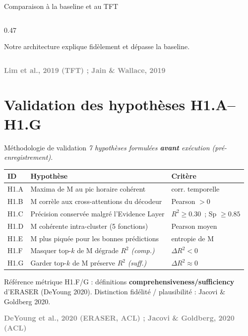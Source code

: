 \documentclass[10pt]{beamer}
\newcommand{\source}[1]{\vspace{4pt}\hfill{\textcolor{gray}{\textbf{\tiny #1}}}}
\begin{document}
\begin{frame}{Comparaison à la baseline et au TFT}
\begin{columns}
\begin{column}{0.47\textwidth}
      \begin{verdictbox}
        \centering\footnotesize
        Notre architecture explique \alert{fidèlement} et \alert{dépasse} la baseline.
      \end{verdictbox}
    \end{column}
  \end{columns}

  \source{Lim et al., 2019 (TFT) ; Jain \& Wallace, 2019}
\end{frame}


\section{Validation des hypothèses H1.A--H1.G}

\begin{frame}{Méthodologie de validation}
  \vspace{-3pt}
  {\footnotesize\textcolor{gray!70}{\textit{7 hypothèses formulées \textbf{avant} exécution (pré-enregistrement).}}}
  \vspace{2pt}

  \begin{minipage}{\linewidth}
  {\footnotesize\setlength{\tabcolsep}{5pt}
  \begin{tabular}{@{}l l l@{}}
    \toprule
    \textbf{ID} & \textbf{Hypothèse} & \textbf{Critère} \\
    \midrule
    H1.A & Maxima de M au pic horaire cohérent & corr. temporelle \\[2pt]
    H1.B & M corrèle aux cross-attentions du décodeur & Pearson $> 0$ \\[2pt]
    H1.C & Précision conservée malgré l'Evidence Layer & $R^2 \geq 0.30$~; Sp $\geq 0.85$ \\[2pt]
    H1.D & M cohérente intra-cluster (5 fonctions) & Pearson moyen \\[2pt]
    H1.E & M plus piquée pour les bonnes prédictions & entropie de M \\[2pt]
    H1.F & Masquer top-$k$ de M dégrade $R^2$ \emph{(comp.)} & $\Delta R^2 < 0$ \\[2pt]
    H1.G & Garder top-$k$ de M préserve $R^2$ \emph{(suff.)} & $\Delta R^2 \approx 0$ \\
    \bottomrule
  \end{tabular}
  }
  \end{minipage}

  \vspace{3pt}
  \begin{exampleblock}{Référence métrique}
    \footnotesize
    H1.F/G : définitions \textbf{comprehensiveness/sufficiency} d'ERASER (DeYoung 2020). Distinction fidélité / plausibilité : Jacovi \& Goldberg 2020.
  \end{exampleblock}

  \source{DeYoung et al., 2020 (ERASER, ACL) ; Jacovi \& Goldberg, 2020 (ACL)}
\end{frame}
\end{document}
